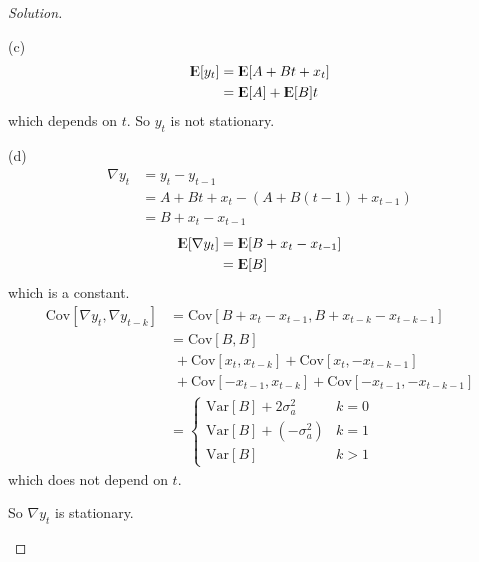 \documentclass[UTF8,a4paper,14pt]{ctexart}
\newcommand{\E}{{\rm I\kern-.3em E}}
\newcommand{\Var}{\mathrm{Var}}
\newcommand{\Cov}{\mathrm{Cov}}
\newenvironment{solution}
  {\renewcommand\qedsymbol{$\blacksquare$}\begin{proof}[Solution]}
  {\end{proof}}
\theoremstyle{definition}
\theoremstyle{remark}
\begin{document}
\begin{solution}
  \begin{mybox}{(c)}
    \begin{equation*}
      \begin{aligned}
        \E[y_t] 
        &=\E[A+Bt+x_t]\\
        &=\E[A]+\E[B]t
      \end{aligned}
    \end{equation*}
    which depends on \(t\). So \(y_t\) is not stationary.
  \end{mybox}
  \begin{mybox}{(d)}
    \begin{equation*}
      \begin{aligned}
        \nabla y_t
        &=y_t - y_{t-1}\\
        &=A+Bt+x_t - (A+B(t-1)+x_{t-1})\\
        &=B+x_t-x_{t-1}
      \end{aligned}
    \end{equation*}
    \begin{equation*}
      \begin{aligned}
        \E[\nabla y_t] 
        &=\E[B+x_t-x_{t-1}]\\
        &=\E[B]
      \end{aligned}
    \end{equation*}
    which is a constant.
    \begin{equation*}
      \begin{aligned}
        \Cov[\nabla y_t,\nabla y_{t-k}] 
        &=\Cov[B+x_t-x_{t-1},B+x_{t-k}-x_{t-k-1}]\\
        &=\Cov[B,B]\\
        &\,\,+\Cov[x_t,x_{t-k}]
        +\Cov[x_t,-x_{t-k-1}]\\
        &\,\,+\Cov[-x_{t-1},x_{t-k}]
        +\Cov[-x_{t-1},-x_{t-k-1}]\\
        &=\begin{cases}
          \Var[B]+2\sigma_a^2 & k=0\\
          \Var[B]+(-\sigma_a^2) & k=1\\
          \Var[B] &k>1
        \end{cases}
      \end{aligned}
    \end{equation*}
    which does not depend on \(t\). 
    
    
    So \(\nabla y_t\) is stationary.
  \end{mybox}
\end{solution}
\end{document}
